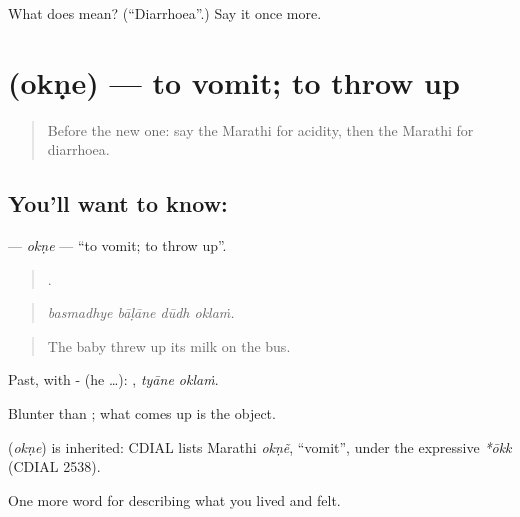 \begin{tcolorbox}[breakable,colback=teal!4,colframe=teal!35!black,title={Before you move on}]
What does  mean? (\textquotedblleft{}Diarrhoea\textquotedblright{}.) Say it once more.
\end{tcolorbox}
\section[\texorpdfstring{\mr{ओकणे} (okṇe)}{ओकणे (okṇe)}]{ (okṇe) — to vomit; to throw up}

\label{lesson:MR-C483-okne}



\begin{quote}
Before the new one: say the Marathi for acidity, then the Marathi for diarrhoea.
\end{quote}

\subsection*{You'll want to know: }
\textbf{} — \emph{okṇe} — \textquotedblleft{}to vomit; to throw up\textquotedblright{}.

\begin{quote}
   .
\end{quote}

\begin{quote}
\emph{basmadhye bāḷāne dūdh oklaṁ.}
\end{quote}

\begin{quote}
The baby threw up its milk on the bus.
\end{quote}

Past, with - (he …):  , \emph{tyāne oklaṁ}.

Blunter than  ; what comes up is the object.

\begin{cousinweb}
\textbf{} (\emph{okṇe}) is inherited: CDIAL lists Marathi \emph{okṇẽ}, \textquotedblleft{}vomit\textquotedblright{}, under the expressive \emph{*ōkk} (CDIAL 2538).
\end{cousinweb}

\begin{grammarlens}[title={What you've built}]
One more word for describing what you lived and felt.
\end{grammarlens}

